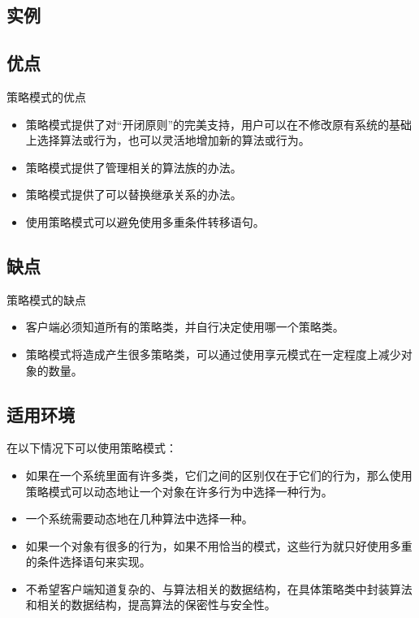 \documentclass[letterpaper,10pt,english]{sphinxmanual}
\begin{document}
\subsection{实例}
\label{\detokenize{behavioral_patterns/strategy:id9}}

\subsection{优点}
\label{\detokenize{behavioral_patterns/strategy:id10}}
\sphinxAtStartPar
策略模式的优点
\begin{itemize}
\item {} 
\sphinxAtStartPar
策略模式提供了对“开闭原则”的完美支持，用户可以在不修改原有系统的基础上选择算法或行为，也可以灵活地增加新的算法或行为。

\item {} 
\sphinxAtStartPar
策略模式提供了管理相关的算法族的办法。

\item {} 
\sphinxAtStartPar
策略模式提供了可以替换继承关系的办法。

\item {} 
\sphinxAtStartPar
使用策略模式可以避免使用多重条件转移语句。

\end{itemize}


\subsection{缺点}
\label{\detokenize{behavioral_patterns/strategy:id11}}
\sphinxAtStartPar
策略模式的缺点
\begin{itemize}
\item {} 
\sphinxAtStartPar
客户端必须知道所有的策略类，并自行决定使用哪一个策略类。

\item {} 
\sphinxAtStartPar
策略模式将造成产生很多策略类，可以通过使用享元模式在一定程度上减少对象的数量。

\end{itemize}


\subsection{适用环境}
\label{\detokenize{behavioral_patterns/strategy:id12}}
\sphinxAtStartPar
在以下情况下可以使用策略模式：
\begin{itemize}
\item {} 
\sphinxAtStartPar
如果在一个系统里面有许多类，它们之间的区别仅在于它们的行为，那么使用策略模式可以动态地让一个对象在许多行为中选择一种行为。

\item {} 
\sphinxAtStartPar
一个系统需要动态地在几种算法中选择一种。

\item {} 
\sphinxAtStartPar
如果一个对象有很多的行为，如果不用恰当的模式，这些行为就只好使用多重的条件选择语句来实现。

\item {} 
\sphinxAtStartPar
不希望客户端知道复杂的、与算法相关的数据结构，在具体策略类中封装算法和相关的数据结构，提高算法的保密性与安全性。

\end{itemize}
\end{document}
